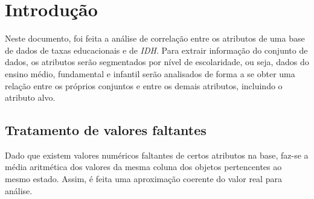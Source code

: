 \newpage
\section{Introdução}

\par Neste documento, foi feita a análise de correlação entre os atributos de uma base de dados de taxas educacionais e de \textit{IDH}. Para extrair informação do conjunto de dados, os atributos serão segmentados por nível de escolaridade, ou seja, dados do ensino médio, fundamental e infantil serão analisados de forma a se obter uma relação entre os próprios conjuntos e entre os demais atributos, incluindo o atributo alvo.

\subsection{Tratamento de valores faltantes}

\par Dado que existem valores numéricos faltantes de certos atributos na base, faz-se a média aritmética dos valores da mesma coluna dos objetos pertencentes ao mesmo estado. Assim, é feita uma aproximação coerente do valor real para análise.